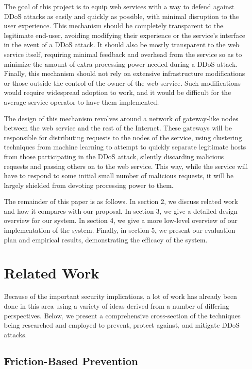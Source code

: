 \documentclass[twocolumn]{article}
\begin{document}
The goal of this project is to equip web services with a way to defend against DDoS attacks as easily and quickly as possible, with minimal disruption to the user experience. This mechanism should be completely transparent to the legitimate end-user, avoiding modifying their experience or the service's interface in the event of a DDoS attack. It should also be mostly transparent to the web service itself, requiring minimal feedback and overhead from the service so as to minimize the amount of extra processing power needed during a DDoS attack. Finally, this mechanism should not rely on extensive infrastructure modifications or those outside the control of the owner of the web service. Such modifications would require widespread adoption to work, and it would be difficult for the average service operator to have them implemented.

The design of this mechanism revolves around a network of gateway-like nodes between the web service and the rest of the Internet. These gateways will be responsible for distributing requests to the nodes of the service, using clustering techniques from machine learning to attempt to quickly separate legitimate hosts from those participating in the DDoS attack, silently discarding malicious requests and passing others on to the web service. This way, while the service will have to respond to some initial small number of malicious requests, it will be largely shielded from devoting processing power to them.

The remainder of this paper is as follows. In section 2, we discuss related work and how it compares with our proposal. In section 3, we give a detailed design overview for our system. In section 4, we give a more low-level overview of our implementation of the system. Finally, in section 5, we present our evaluation plan and empirical results, demonstrating the efficacy of the system.

\section{Related Work}

Because of the important security implications, a lot of work has already been done in this area using a variety of ideas derived from a number of differing perspectives. Below, we present a comprehensive cross-section of the techniques being researched and employed to prevent, protect against, and mitigate DDoS attacks.

\subsection{Friction-Based Prevention}
\end{document}
